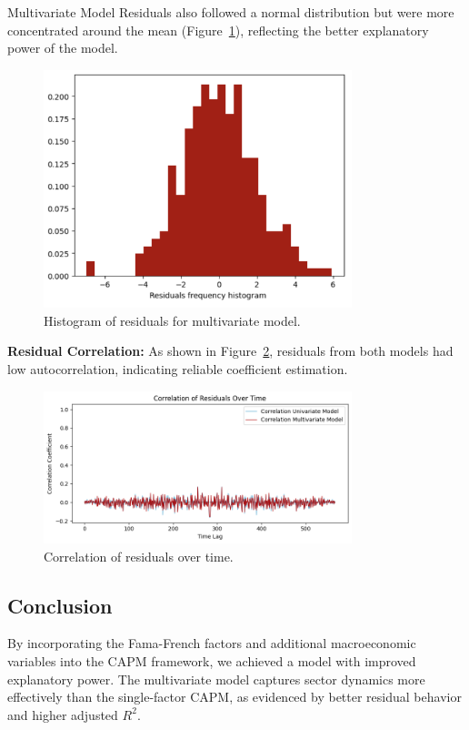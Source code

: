 Multivariate Model Residuals also followed a normal distribution but were more concentrated around the mean 
(Figure~\ref{fig:7_7}), reflecting the better explanatory power of the model.

\begin{figure}[h!]
    \centering
    \includegraphics[width=0.8\textwidth]{images/7_7.png}
    \caption{Histogram of residuals for multivariate model.}\label{fig:7_7}
\end{figure}

\textbf{Residual Correlation:} As shown in Figure~\ref{fig:7_8}, residuals from both models had low autocorrelation, 
indicating reliable coefficient estimation.

\begin{figure}[h!]
    \centering
    \includegraphics[width=0.8\textwidth]{images/7_8.png}
    \caption{Correlation of residuals over time.}\label{fig:7_8}
\end{figure}


\subsection*{Conclusion}
By incorporating the Fama-French factors and additional macroeconomic variables into the CAPM framework, we achieved a model
with improved explanatory power.
The multivariate model captures sector dynamics more effectively than the single-factor CAPM, as evidenced by better residual 
behavior and higher adjusted $R^2$.



